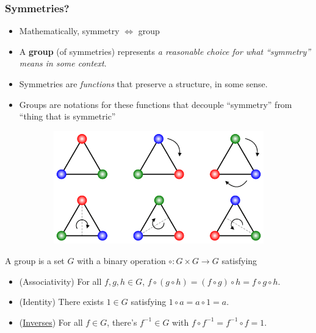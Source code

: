 \documentclass[10pt]{beamer}
\begin{document}
\begin{frame}
  \frametitle{Symmetries?}
  \begin{itemize}
  \item Mathematically, symmetry $\Leftrightarrow$ group
  \item A \textbf{group} (of symmetries) represents \textit{a reasonable choice for what ``symmetry'' means in some context}.
  \item Symmetries are \textit{functions} that preserve a structure, in some sense.
  \item Groups are notations for these functions that decouple ``symmetry'' from ``thing that is symmetric''
  \end{itemize}
  \begin{figure}
    \begin{subfigure}{0.5\textwidth}
      \centering
      \includegraphics[width=0.8\linewidth]{tri-dihedral.png}
    \end{subfigure}%
    \begin{subfigure}{0.5\textwidth}
      \centering
    \end{subfigure}
  \end{figure}
  A group is a set $G$ with a binary operation $\circ: G \times G \to G$ satisfying
  \begin{itemize}
  \item (Associativity) For all $f, g, h \in G$, $f \circ (g \circ h) = (f \circ g) \circ h = f \circ g \circ h$.
  \item (Identity) There exists $1 \in G$ satisfying $1 \circ a = a \circ 1 = a$.
  \item (\underline{Inverses}) For all $f \in G$, there's $f^{-1} \in G$ with $f \circ f^{-1} = f^{-1} \circ f = 1$.
  \end{itemize}
\end{frame}
\end{document}
